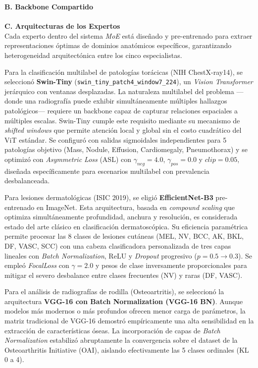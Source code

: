\documentclass[conference, 11pt]{IEEEtran}
\begin{document}
\textbf{B. Backbone Compartido} \\
[Describe la arquitectura de tu ViT congelado (o similar) y cómo se extraen los CLS tokens $z \in \mathbb{R}^{d_{model}}$ para alimentar los routers a partir de las imágenes.] \\

\textbf{C. Arquitecturas de los Expertos} \\
Cada experto dentro del sistema \textit{MoE} está diseñado y pre-entrenado para extraer representaciones óptimas de dominios anatómicos específicos, garantizando heterogeneidad arquitectónica entre los cinco especialistas.

Para la clasificación multilabel de patologías torácicas (NIH ChestX-ray14), se seleccionó \textbf{Swin-Tiny} (\texttt{swin\_tiny\_patch4\_window7\_224}), un \textit{Vision Transformer} jerárquico con ventanas desplazadas. La naturaleza multilabel del problema ---donde una radiografía puede exhibir simultáneamente múltiples hallazgos patológicos--- requiere un backbone capaz de capturar relaciones espaciales a múltiples escalas. Swin-Tiny cumple este requisito mediante su mecanismo de \textit{shifted windows} que permite atención local y global sin el costo cuadrático del ViT estándar. Se configuró con salidas sigmoidales independientes para 5 patologías objetivo (Mass, Nodule, Effusion, Cardiomegaly, Pneumothorax) y se optimizó con \textit{Asymmetric Loss} (ASL) con $\gamma_{neg}=4.0$, $\gamma_{pos}=0.0$ y $clip=0.05$, diseñada específicamente para escenarios multilabel con prevalencia desbalanceada.

Para lesiones dermatológicas (ISIC 2019), se eligió \textbf{EfficientNet-B3} pre-entrenado en ImageNet. Esta arquitectura, basada en \textit{compound scaling} que optimiza simultáneamente profundidad, anchura y resolución, es considerada estado del arte clásico en clasificación dermatoscópica. Su eficiencia paramétrica permite procesar las 8 clases de lesiones cutáneas (MEL, NV, BCC, AK, BKL, DF, VASC, SCC) con una cabeza clasificadora personalizada de tres capas lineales con \textit{Batch Normalization}, ReLU y \textit{Dropout} progresivo ($p=0.5 \rightarrow 0.3$). Se empleó \textit{FocalLoss} con $\gamma=2.0$ y pesos de clase inversamente proporcionales para mitigar el severo desbalance entre clases frecuentes (NV) y raras (DF, VASC).

Para el análisis de radiografías de rodilla (Osteoartritis), se seleccionó la arquitectura \textbf{VGG-16 con Batch Normalization (VGG-16 BN)}. Aunque modelos más modernos o más profundos ofrecen menor carga de parámetros, la matriz tradicional de VGG-16 demostró empíricamente una alta sensibilidad en la extracción de características óseas. La incorporación de capas de \textit{Batch Normalization} estabilizó abruptamente la convergencia sobre el dataset de la Osteoarthritis Initiative (OAI), aislando efectivamente las 5 clases ordinales (KL 0 a 4).
\end{document}
